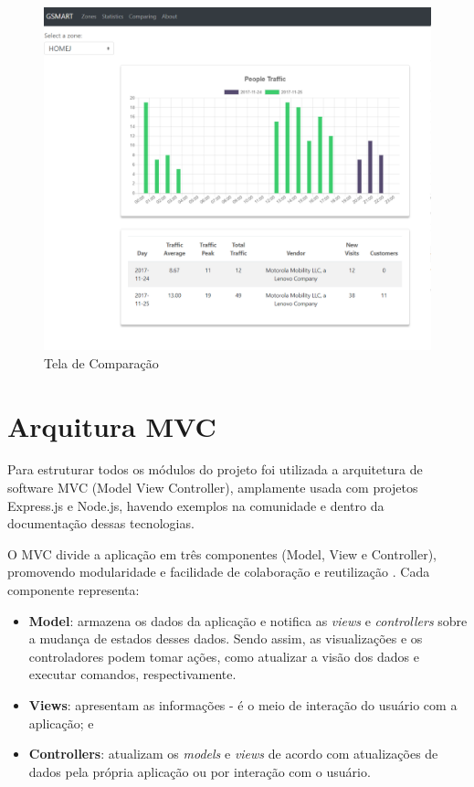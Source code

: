 \begin{figure}[!h]
  \caption{\label{comparing-ap}Tela de Comparação}
  \begin{center}
    \includegraphics[width=1.0\textwidth]{img/comparing.png}
  \end{center}
\end{figure}

\section{Arquitura MVC}
Para estruturar todos os módulos do projeto foi utilizada a arquitetura de
software MVC (Model View Controller), amplamente usada com projetos
Express.js e Node.js, havendo exemplos na comunidade e dentro da documentação dessas
tecnologias.

O MVC divide a aplicação em três componentes (Model, View e Controller),
promovendo modularidade e facilidade de colaboração e reutilização \cite{mdn}. Cada componente representa:

\begin{itemize}
    \item \textbf{Model}: armazena os dados da aplicação e notifica as \emph{views} e
    \emph{controllers} sobre a mudança de estados desses dados. Sendo assim, as visualizações e os controladores
    podem tomar ações, como atualizar a visão dos dados e executar comandos, respectivamente.
    \item \textbf{Views}: apresentam as informações - é o meio de interação do usuário com
    a aplicação; e
    \item \textbf{Controllers}: atualizam os \emph{models} e \emph{views} de acordo
    com atualizações de dados pela própria aplicação ou por interação com o usuário.
\end{itemize}

